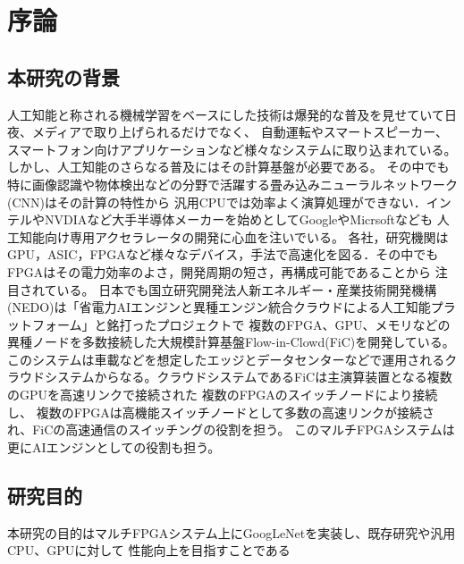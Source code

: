 \chapter{序論}
{
    \label{chap:introducion}

    \section{本研究の背景}
    \label{sec:backgroud}
    人工知能と称される機械学習をベースにした技術は爆発的な普及を見せていて日夜、メディアで取り上げられるだけでなく、
    自動運転やスマートスピーカー、スマートフォン向けアプリケーションなど様々なシステムに取り込まれている。
    しかし、人工知能のさらなる普及にはその計算基盤が必要である。
    その中でも特に画像認識や物体検出などの分野で活躍する畳み込みニューラルネットワーク(CNN)はその計算の特性から
    汎用CPUでは効率よく演算処理ができない．インテルやNVDIAなど大手半導体メーカーを始めとしてGoogleやMicrsoftなども
    人工知能向け専用アクセラレータの開発に心血を注いでいる。
    各社，研究機関はGPU，ASIC，FPGAなど様々なデバイス，手法で高速化を図る．その中でもFPGAはその電力効率のよさ，開発周期の短さ，再構成可能であることから
    注目されている。
    日本でも国立研究開発法人新エネルギー・産業技術開発機構(NEDO)は「省電力AIエンジンと異種エンジン統合クラウドによる人工知能プラットフォーム」と銘打ったプロジェクトで
    複数のFPGA、GPU、メモリなどの異種ノードを多数接続した大規模計算基盤Flow-in-Clowd(FiC)を開発している。
    このシステムは車載などを想定したエッジとデータセンターなどで運用されるクラウドシステムからなる。クラウドシステムであるFiCは主演算装置となる複数のGPUを高速リンクで接続された
    複数のFPGAのスイッチノードにより接続し、
    複数のFPGAは高機能スイッチノードとして多数の高速リンクが接続され、FiCの高速通信のスイッチングの役割を担う。
    このマルチFPGAシステムは更にAIエンジンとしての役割も担う。

    \section{研究目的}
    \label{sec:purpose}
    本研究の目的はマルチFPGAシステム上にGoogLeNetを実装し、既存研究や汎用CPU、GPUに対して
    性能向上を目指すことである

}

